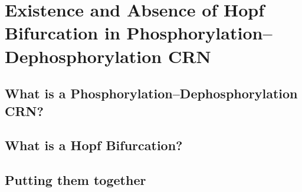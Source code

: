 \chapter{Existence and Absence of Hopf Bifurcation in Phosphorylation–Dephosphorylation CRN}

\section{What is a Phosphorylation–Dephosphorylation CRN?}  

\section{What is a Hopf Bifurcation?}

\section{Putting them together}
